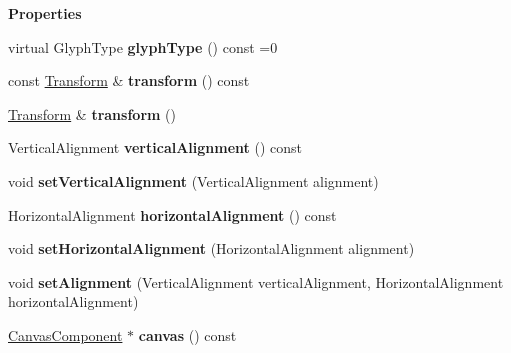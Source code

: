 \begin{Indent}\textbf{ Properties}\par
\begin{DoxyCompactItemize}
\item 
\mbox{\label{classrev_1_1_glyph_a3a7452c65b7e68534a86e82d08a09f7d}} 
virtual Glyph\+Type {\bfseries glyph\+Type} () const =0
\item 
\mbox{\label{classrev_1_1_glyph_aa8e79c6ea811d4bb2ec7eb9838223ee0}} 
const \mbox{\hyperlink{classrev_1_1_transform}{Transform}} \& {\bfseries transform} () const
\item 
\mbox{\label{classrev_1_1_glyph_adf90ca4e4c4315a7570a453ab2b2c05a}} 
\mbox{\hyperlink{classrev_1_1_transform}{Transform}} \& {\bfseries transform} ()
\item 
\mbox{\label{classrev_1_1_glyph_a63be3fac54319f331a241cdcba23ed8a}} 
Vertical\+Alignment {\bfseries vertical\+Alignment} () const
\item 
\mbox{\label{classrev_1_1_glyph_a4b3b2a1aa87b5e565a18f063f9b97ae5}} 
void {\bfseries set\+Vertical\+Alignment} (Vertical\+Alignment alignment)
\item 
\mbox{\label{classrev_1_1_glyph_acfa83c8d97f20709f43061c7d30f9445}} 
Horizontal\+Alignment {\bfseries horizontal\+Alignment} () const
\item 
\mbox{\label{classrev_1_1_glyph_af0db87d3147cf0f4f752669e0161447b}} 
void {\bfseries set\+Horizontal\+Alignment} (Horizontal\+Alignment alignment)
\item 
\mbox{\label{classrev_1_1_glyph_af03da526c01294a53835b9d776a2c5f4}} 
void {\bfseries set\+Alignment} (Vertical\+Alignment vertical\+Alignment, Horizontal\+Alignment horizontal\+Alignment)
\item 
\mbox{\label{classrev_1_1_glyph_aea19ee442f267bf097d79bd80566b8ea}} 
\mbox{\hyperlink{classrev_1_1_canvas_component}{Canvas\+Component}} $\ast$ {\bfseries canvas} () const
\end{DoxyCompactItemize}
\end{Indent}
